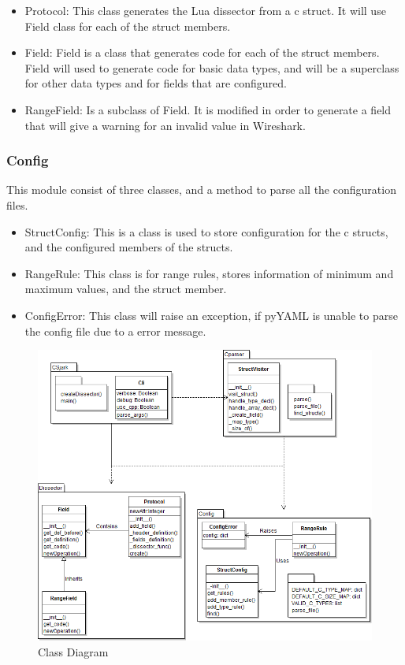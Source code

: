 \begin{itemize}
	\item Protocol: This class generates the Lua dissector from a c struct. It will use Field class for each of the struct members.
	\item Field: Field is a class that generates code for each of the struct members. Field will used to generate code for basic data types, and will be a superclass for other data types and for fields that are configured.
	\item RangeField: Is a subclass of Field. It is modified in order to generate a field that will give a warning for an invalid value in Wireshark.
\end{itemize}

\subsubsection{Config}
This module consist of three classes, and a method to parse all the configuration files.
\begin{itemize}
	\item StructConfig: This is a class is used to store configuration for the c structs, and the configured members of the structs.
	\item RangeRule: This class is for range rules, stores information of minimum and maximum values, and the struct member.
	\item ConfigError: This class will raise an exception, if pyYAML is unable to parse the config file due to a error message.
\end{itemize}

\begin{figure}[!htb]
	\center
	\includegraphics[width=\textwidth]{./sprints/img/class_diagram_s1}
	\caption{Class Diagram\label{fig:sp1_class}}
\end{figure}

